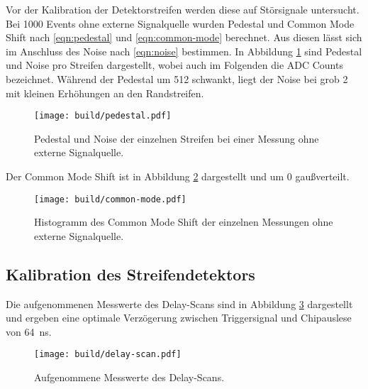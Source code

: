 Vor der Kalibration der Detektorstreifen werden diese auf Störsignale untersucht.
Bei \num{1000} Events ohne externe Signalquelle wurden Pedestal und Common Mode Shift
nach \eqref{eqn:pedestal} und \eqref{eqn:common-mode} berechnet.
Aus diesen lässt sich im Anschluss des Noise nach \eqref{eqn:noise} bestimmen.
In Abbildung \ref{fig:pedestal} sind Pedestal und Noise pro Streifen dargestellt,
wobei auch im Folgenden \si{\adc} die ADC Counts bezeichnet.
Während der Pedestal um \SI{512}{\adc} schwankt, liegt der Noise bei grob
\SI{2}{\adc} mit kleinen Erhöhungen an den Randstreifen.
\begin{figure}
  \centering
  \texttt{[image: build/pedestal.pdf]}  %
  \caption{Pedestal und Noise der einzelnen Streifen bei einer Messung ohne externe
  Signalquelle.}
  \label{fig:pedestal}
\end{figure}
Der Common Mode Shift ist in Abbildung \ref{fig:common-mode} dargestellt und
um \SI{0}{\adc} gaußverteilt.
\begin{figure}
  \centering
  \texttt{[image: build/common-mode.pdf]}  %
  \caption{Histogramm des Common Mode Shift der einzelnen Messungen ohne externe
  Signalquelle.}
  \label{fig:common-mode}
\end{figure}

\FloatBarrier
\subsection{Kalibration des Streifendetektors}
\label{sec:Kalibration-Auswertung}

Die aufgenommenen Messwerte des Delay-Scans sind in Abbildung \ref{fig:delay-scan}
dargestellt und ergeben eine optimale Verzögerung zwischen Triggersignal und
Chipauslese von \SI{64}{\nano\second}.
\begin{figure}
  \centering
  \texttt{[image: build/delay-scan.pdf]}  %
  \caption{Aufgenommene Messwerte des Delay-Scans.}
  \label{fig:delay-scan}
\end{figure}

